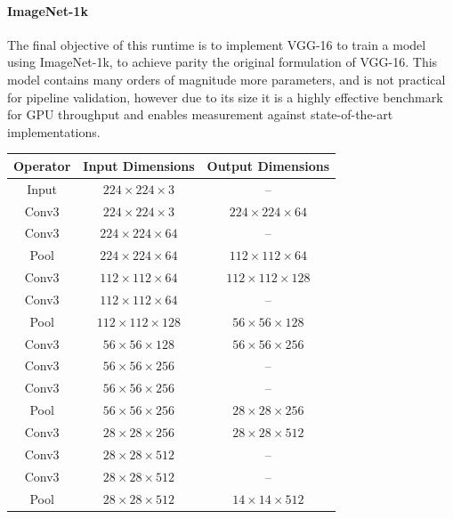 \documentclass[10pt, a4paper]{article}
\begin{document}
\paragraph{ImageNet-1k} The final objective of this runtime is to implement VGG-16 to train a model using ImageNet-1k, to achieve parity the original formulation of VGG-16. This model contains many orders of magnitude more parameters, and is not practical for pipeline validation, however due to its size it is a highly effective benchmark for GPU throughput and enables measurement against state-of-the-art implementations.

\begin{table}[H]
\centering
\small
\renewcommand{\arraystretch}{0.8}
\begin{tabular}{|c|c|c|}
	\hline
	\textbf{Operator} & \textbf{Input Dimensions} & \textbf{Output Dimensions}\\
    \hline
    Input & $ 224 \times 224 \times 3 $&-- \\
    \hline
    Conv3 & $ 224 \times 224 \times 3 $ & $ 224 \times 224 \times 64 $ \\
    Conv3 & $ 224 \times 224 \times 64 $ & -- \\
    Pool & $ 224 \times 224 \times 64 $ & $ 112 \times 112 \times 64 $ \\
    \hline

    Conv3 & $ 112 \times 112 \times 64 $ & $ 112 \times 112 \times 128 $ \\
    Conv3 & $ 112 \times 112 \times 64 $ & -- \\
    Pool & $ 112 \times 112 \times 128 $ & $ 56 \times 56 \times 128 $ \\
    \hline

    Conv3 & $ 56 \times 56 \times 128 $ & $ 56 \times 56 \times 256 $ \\
    Conv3 & $ 56 \times 56 \times 256 $ & -- \\
    Conv3 & $ 56 \times 56 \times 256 $ & -- \\
    Pool & $ 56 \times 56 \times 256 $ & $ 28 \times 28 \times 256 $ \\
    \hline

    Conv3 & $ 28 \times 28 \times 256 $ & $ 28 \times 28 \times 512 $ \\
    Conv3 & $ 28 \times 28 \times 512 $ & -- \\
    Conv3 & $ 28 \times 28 \times 512 $ & -- \\
    Pool & $ 28 \times 28 \times 512 $ & $ 14 \times 14 \times 512 $ \\
    \hline


\end{tabular}
\end{table}
\end{document}
